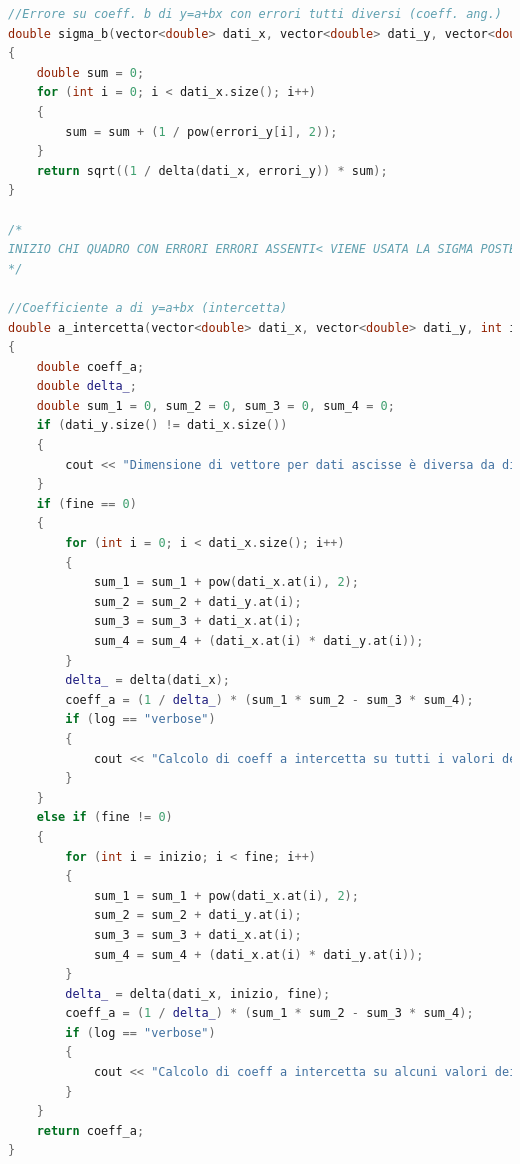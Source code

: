 \documentclass[a4paper,11pt,oneside]{article}
\begin{document}
\begin{lstlisting}[language=C++, label=lst:statistica.h, caption=statistica.h]
//Errore su coeff. b di y=a+bx con errori tutti diversi (coeff. ang.)
double sigma_b(vector<double> dati_x, vector<double> dati_y, vector<double> errori_y)
{
    double sum = 0;
    for (int i = 0; i < dati_x.size(); i++)
    {
        sum = sum + (1 / pow(errori_y[i], 2));
    }
    return sqrt((1 / delta(dati_x, errori_y)) * sum);
}

/*
INIZIO CHI QUADRO CON ERRORI ERRORI ASSENTI< VIENE USATA LA SIGMA POSTERIORI
*/

//Coefficiente a di y=a+bx (intercetta)
double a_intercetta(vector<double> dati_x, vector<double> dati_y, int inizio = 0, int fine = 0, string log = "")
{
    double coeff_a;
    double delta_;
    double sum_1 = 0, sum_2 = 0, sum_3 = 0, sum_4 = 0;
    if (dati_y.size() != dati_x.size())
    {
        cout << "Dimensione di vettore per dati ascisse è diversa da dimensione vettore dati ordinate" << endl;
    }
    if (fine == 0)
    {
        for (int i = 0; i < dati_x.size(); i++)
        {
            sum_1 = sum_1 + pow(dati_x.at(i), 2);
            sum_2 = sum_2 + dati_y.at(i);
            sum_3 = sum_3 + dati_x.at(i);
            sum_4 = sum_4 + (dati_x.at(i) * dati_y.at(i));
        }
        delta_ = delta(dati_x);
        coeff_a = (1 / delta_) * (sum_1 * sum_2 - sum_3 * sum_4);
        if (log == "verbose")
        {
            cout << "Calcolo di coeff a intercetta su tutti i valori dei vettori forniti (" << coeff_a << ")" << endl;
        }
    }
    else if (fine != 0)
    {
        for (int i = inizio; i < fine; i++)
        {
            sum_1 = sum_1 + pow(dati_x.at(i), 2);
            sum_2 = sum_2 + dati_y.at(i);
            sum_3 = sum_3 + dati_x.at(i);
            sum_4 = sum_4 + (dati_x.at(i) * dati_y.at(i));
        }
        delta_ = delta(dati_x, inizio, fine);
        coeff_a = (1 / delta_) * (sum_1 * sum_2 - sum_3 * sum_4);
        if (log == "verbose")
        {
            cout << "Calcolo di coeff a intercetta su alcuni valori dei vettori forniti (" << coeff_a << ")" << endl;
        }
    }
    return coeff_a;
}


\end{lstlisting}
\end{document}

